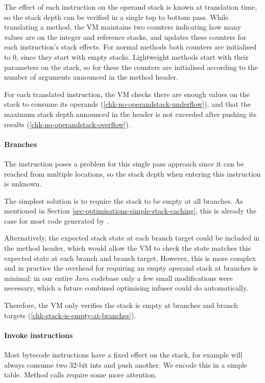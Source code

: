 The effect of each instruction on the operand stack is known at translation time, so the stack depth can be verified in a single top to bottom pass. While translating a method, the VM maintains two counters indicating how many values are on the integer and reference stacks, and updates these counters for each instruction's stack effects. For normal methods both counters are initialised to 0, since they start with empty stacks. Lightweight methods start with their parameters on the stack, so for these the counters are initialised according to the number of arguments announced in the method header.

For each translated instruction, the VM checks there are enough values on the stack to consume its operands (\ref{chk-no-operandstack-underflow}), and that the maximum stack depth announced in the header is not exceeded after pushing its results (\ref{chk-no-operandstack-overflow}).

\paragraph{Branches}
The  instruction poses a problem for this single pass approach since it can be reached from multiple locations, so the stack depth when entering this instruction is unknown.

The simplest solution is to require the stack to be empty at all branches. As mentioned in Section \ref{sec-optimisations-simple-stack-caching}, this is already the case for most code generated by .

Alternatively, the expected stack state at each branch target could be included in the method header, which would allow the VM to check the state matches this expected state at each branch and branch target. However, this is more complex and in practice the overhead for requiring an empty operand stack at branches is minimal: in our entire Java codebase only a few small modifications were necessary, which a future combined optimising infuser could do automatically.

Therefore, the VM only verifies the stack is empty at branches and branch targets (\ref{chk-stack-is-empty-at-branches}).

\paragraph{Invoke instructions}
Most bytecode instructions have a fixed effect on the stack, for example  will always consume two 32-bit ints and push another. We encode this in a simple table. Method calls require some more attention.

